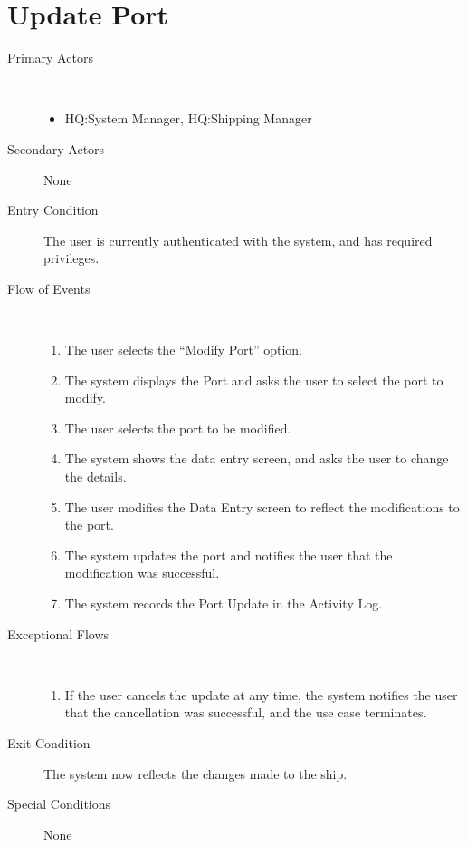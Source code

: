 \documentclass[a4paper,10pt]{report}
\begin{document}
\section{Update Port}
\begin{description}
\item[Primary Actors] \
  \begin{itemize}
  \item HQ:System Manager, HQ:Shipping Manager
  \end{itemize}
\item[Secondary Actors] None
\item[Entry Condition]
  The user is currently authenticated with the system, and has required privileges.
\item[Flow of Events] \
  \begin{enumerate}
  \item The user selects the ``Modify Port'' option.
  \item The system displays the Port and asks the user to select the port to modify.
  \item The user selects the port to be modified.
  \item The system shows the data entry screen, and asks the user to change the details.
  \item The user modifies the Data Entry screen to reflect the modifications to the port.
  \item The system updates the port and notifies the user that the modification was successful.
    \item The system records the Port Update in the Activity Log.
  \end{enumerate}
\item[Exceptional Flows] \
  \begin{enumerate}
  \item If the user cancels the update at any time, the system notifies the user that the cancellation was successful, and the use case terminates.
  \end{enumerate}
\item[Exit Condition]
  The system now reflects the changes made to the ship.
\item[Special Conditions] None
\end{description}
\end{document}
